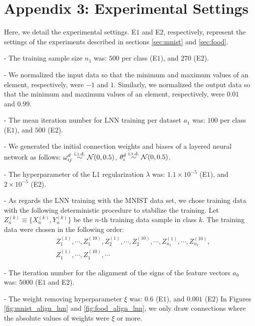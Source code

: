 \documentclass{article}
\begin{document}

\section*{Appendix 3: Experimental Settings}
\label{sec:settings}

Here, we detail the experimental settings. E$1$ and E$2$, respectively, represent the settings of the experiments described in sections \ref{sec:mnist} and \ref{sec:food}. 

- The training sample size $n_1$ was: $500$ per class (E$1$), and $270$ (E$2$).

- We normalized the input data so that the minimum and maximum values of an element, respectively, were $-1$ and $1$. Similarly, we normalized the output data so that the minimum and maximum values of an element, respectively, were $0.01$ and $0.99$. 

- The mean iteration number for LNN training per dataset $a_1$ was: $100$ per class (E$1$), and $500$ (E$2$). 

- We generated the initial connection weights and biases of a layered neural network as follows: 
$\omega^d_{ij}\overset{\text\small\rm{i.i.d.}}{\sim}\mathcal{N}(0,0.5)$, $\theta^d_i\overset{\text\small\rm{i.i.d.}}{\sim}\mathcal{N}(0,0.5)$. 

- The hyperparameter of the L1 regularization $\lambda$ was: $1.1\times 10^{-5}$ (E$1$), and $2\times 10^{-5}$ (E$2$). 

- As regards the LNN training with the MNIST data set, we chose training data with the following deterministic procedure to stabilize the training. Let $Z^{(k)}_n\equiv \{X^{(k)}_n, Y^{(k)}_n\}$ be the $n$-th training data sample in class $k$. The training data were chosen in the following order: 
\begin{eqnarray*}
&&Z^{(1)}_1, \cdots, Z^{(10)}_1, Z^{(1)}_2, \cdots, Z^{(10)}_2, \cdots, Z^{(1)}_{n_1}, \cdots, Z^{(10)}_{n_1}, \\ 
&&Z^{(1)}_1, \cdots, Z^{(10)}_1, \cdots
\end{eqnarray*}

- The iteration number for the alignment of the signs of the feature vectors $a_0$ was: $5000$ (E$1$ and E$2$). 

- The weight removing hyperparameter $\xi$ was: $0.6$ (E$1$), and $0.001$ (E$2$) In Figures \ref{fig:mnist_align_lnn} and \ref{fig:food_align_lnn}, we only draw connections where the absolute values of weights were $\xi$ or more. 
\end{document}
